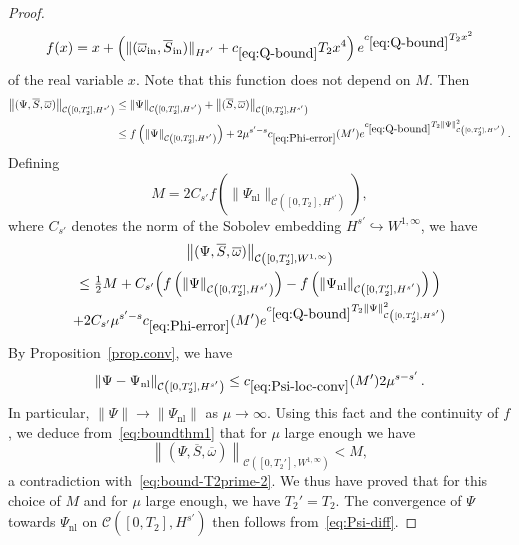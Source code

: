 \documentclass[10pt]{amsart}
\theoremstyle{definition}\newtheorem{defi}[theo]{Definition}\newtheorem{rema}[theo]{Remark}\newtheorem{exam}[theo]{Example}\newtheorem{exem}[theo]{Example}\newtheorem{nota}[theo]{Notation}
\newcommand{\rmin}{\mathrm{in}}
\newcommand{\nl}{\mathrm{nl}}
\newcommand{\cC}{\mathcal{C}}
\newcommand\ii{{\ensuremath {\infty}}}
\begin{document}
\begin{proof}
\begin{equation*}
f(x)=x + \left(\|(\overline\omega_\rmin, \overline{S}_\rmin)\|_{H^{s'}} + c_{\eqref{eq:Q-bound}} T_2 x^4\right) e^{c_{\eqref{eq:Q-bound}} T_2 x^2}
\end{equation*}
of the real variable $x$. Note that this function does not depend on $M$. Then
\begin{align*}
\left\|(\Psi, \overline{S},\overline{\omega})\right\|_{\cC\left([0,T_2'], {H}^{s'}\right)} &\leq \|\Psi\|_{\cC\left([0,T_2'], {H}^{s'}\right)} + \left\|(\overline{S}, \overline{\omega})\right\|_{\cC\left([0,T_2'], H^{s'}\right)} \\
&\leq f\left(\|\Psi\|_{\cC\left([0,T_2'], {H}^{s'}\right)}\right) + 2\mu^{s'-s} c_{\eqref{eq:Phi-error}}(M') e^{c_{\eqref{eq:Q-bound}} T_2 \|\Psi\|_{\cC\left([0,T_2'], H^{s'}\right)}^2}\,.\\
\end{align*}
Defining
\begin{equation*}
M= 2 C_{s'} f\left(\|\Psi_{\nl}\|_{\cC\left([0,T_2], {H}^{s'}\right)}\right),
\end{equation*}
where $C_{s'}$ denotes the norm of the Sobolev embedding ${H}^{s'}\hookrightarrow W^{1,\infty}$, we have
\begin{multline}\label{eq:boundthm1}
\left\|(\Psi, \overline{S},\overline{\omega})\right\|_{\cC\left([0,T_2'], W^{1,\ii}\right)}\\
\leq \tfrac12 M + C_{s'}\Big(f\left(\|\Psi\|_{\cC\left([0,T_2'], {H}^{s'}\right)}\right)-f\left(\|\Psi_{\nl}\|_{\cC\left([0,T_2'], {H}^{s'}\right)}\right)\Big) \\
+ 2C_{s'} \mu^{s'-s} c_{\eqref{eq:Phi-error}}(M') e^{c_{\eqref{eq:Q-bound}} T_2 \|\Psi\|_{\cC\left([0,T_2'], H^{s'}\right)}^2}
\end{multline}
By Proposition~\ref{prop.conv}, we have
\begin{equation}\label{eq:Psi-diff}
\|\Psi-\Psi_{\nl}\|_{\cC\left([0, T_2'],H^{s'}\right)}\leq c_{\eqref{eq:Psi-loc-conv}}(M') 2\mu^{s-s'}\,.
\end{equation}
In particular, $\|\Psi\| \to \|\Psi_\nl\|$ as $\mu\to\infty$. Using this fact and the continuity of $f$, we deduce from~\eqref{eq:boundthm1} that for $\mu$ large enough we have
\[
\left\|(\Psi, \overline{S},\overline{\omega})\right\|_{\cC\left([0,T_2'], W^{1,\ii}\right)}<M,
\]
a contradiction with~\eqref{eq:bound-T2prime-2}. We thus have proved that for this choice of $M$ and for $\mu$ large enough, we have $T_2'=T_2$. The convergence of $\Psi$ towards $\Psi_{\nl}$ on $\cC([0,T_2],H^{s'})$ then follows from~\eqref{eq:Psi-diff}.
\end{proof}
\end{document}
